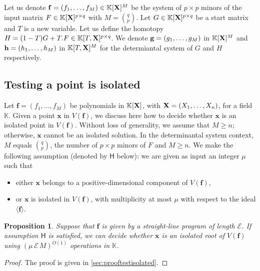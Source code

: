 \documentclass[11pt]{article}
\numberwithin{Property}{section}
\numberwithin{Theorem}{section}
\newtheorem{Proposition}{Proposition}%
\numberwithin{Proposition}{section}
\numberwithin{Lemma}{section}
\numberwithin{Corollary}{section}
\numberwithin{Definition}{section}
\numberwithin{Remark}{section}
\numberwithin{Conjecture}{section}
\numberwithin{Problem}{section}
\numberwithin{Claim}{section}
\theoremstyle{definition}
\numberwithin{Example}{section}
\renewcommand{\ge}{\geqslant}
\renewcommand{\ge}{\geqslant} %
\newcommand{\field}{\mathbb{K}} %
\newcommand{\mat}[1]{\mathbf{\MakeUppercase{#1}}} %
\newcommand{\improve}[1]{\textcolor{blue}{#1}} %
\begin{document}
Let us denote ${\bf{f}} = (f_1, \ldots, f_M) \in \field[{\mat{X}}]^M$ be the system of $p \times p$ minors of the input matrix $F \in \field[\mat{X}]^{p \times q}$ with $M = {{q}\choose{p}}$. Let $G \in \field[\mat{X}]^{p \times q}$ be a start matrix and $T$ is a new variable. Let us define the homotopy $H = (1-T)G + T.F \in \field[T,\mat{X}]^{p \times q}$. We denote ${\bf g} = (g_1, \ldots, g_M)$ in $\field[\mat{X}]^M$ and ${\bf h} = (h_1, \ldots, h_M)$ in $\field[T,\mat{X}]^M$ for the determiantal system of $G$ and $H$ respectively. 

\subsection{Testing a point is isolated}
\label{subsec:isolated}
Let $\mathbf{f}=(f_1,\dots,f_M)$ be polynomials in $\field[\mat{X}]$, with $\mat{X}=(X_1,\dots,X_n)$, for a field $\field$. Given a point $\mathbf{x}$ in $V(\mathbf{f})$, we discuss here how to decide whether $\mathbf{x}$ is an isolated point in $V(\mathbf{f})$. Without loss of generality, we assume that $M\ge n$; otherwise, $\mathbf{x}$
cannot be an isolated solution. In the determinantal system context, $M$ equals ${q \choose p}$, the number of $p\times p$ minors of $F$ and $M \ge n$. We make the following assumption (denoted by $\mathsf{H}$ below): we are given as input an integer $\mu$ such that
\begin{itemize}
\item either $\mathbf{x}$ belongs to a positive-dimensional component of $V(\mathbf{f})$,
\item or $\mathbf{x}$ is isolated in $V(\mathbf{f})$, with multiplicity at most $\mu$
  with respect to the ideal $\langle \mathbf{f} \rangle$.
\end{itemize}

\begin{Proposition}\label{testisolated} Suppose that $\mathbf{f}$ is given by a straight-line program of length $\mathcal{E}$. If assumption $\mathsf{H}$ is satisfied, we can decide whether $\mathbf{x}$ is an isolated root of $V(\mathbf{f})$ using $(\mu \,\mathcal{E} \,M)^{O(1)}$ operations in $\field$.
\end{Proposition}
\begin{proof}
The proof is given in \improve{\cref{sec:prooftestisolated}}. 
\end{proof}
\end{document}

